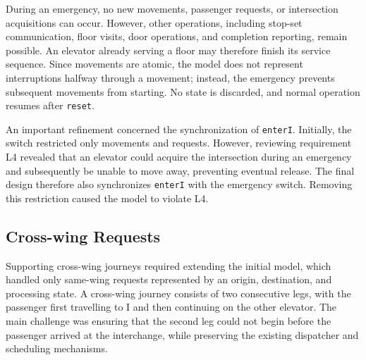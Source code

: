 During an emergency, no new movements, passenger requests, or intersection acquisitions can occur. However, other operations, including stop-set communication, floor visits, door operations, and completion reporting, remain possible. An elevator already serving a floor may therefore finish its service sequence. Since movements are atomic, the model does not represent interruptions halfway through a movement; instead, the emergency prevents subsequent movements from starting. No state is discarded, and normal operation resumes after \texttt{reset}.

An important refinement concerned the synchronization of \texttt{enterI}. Initially, the switch restricted only movements and requests. However, reviewing requirement L4 revealed that an elevator could acquire the intersection during an emergency and subsequently be unable to move away, preventing eventual release. The final design therefore also synchronizes \texttt{enterI} with the emergency switch. Removing this restriction caused the model to violate L4. 


\subsection{Cross-wing Requests}
\label{subsec:cross-wing}

Supporting cross-wing journeys required extending the initial model, which handled only same-wing requests represented by an origin, destination, and processing state. A cross-wing journey consists of two consecutive legs, with the passenger first travelling to I and then continuing on the other elevator. The main challenge was ensuring that the second leg could not begin before the passenger arrived at the interchange, while preserving the existing dispatcher and scheduling mechanisms.

